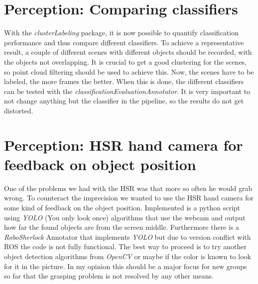 \documentclass[main.tex]{subfiles}
\begin{document}
		\section{Perception: Comparing classifiers}
		With the \textit{clusterLabeling} package, it is now possible to quantify classification performance and thus compare different classifiers. To achieve a 					representative result, a couple of different scenes with different objects should be recorded, with the objects not overlapping. It is crucial to get a
		good clustering for the scenes, so point cloud filtering should be used to achieve this. Now, the scenes have to be labeled, the more frames the better. 
		When this is done, the different classifiers can be tested with the \textit{classificationEvaluationAnnotator}. It is very important to not change anything but 
		the classifier in the pipeline, so the results do not get distorted.
		
		\section{Perception: HSR hand camera for feedback on object position}\label{fut_hsr_hand_camera_feedback}
		One of the problems we had with the HSR was that more so often he would grab wrong.
		To counteract the imprecision we wanted to use the HSR hand camera for some kind of feedback on the object position.
		Implemented is a python script using \textit{YOLO} (You only look once) algorithms that use the webcam and output how far the found objects are from the screen middle.
		Furthermore there is a \textit{RoboSherlock} Annotator that implements \textit{YOLO} but due to version conflict with ROS the code is not fully functional.
		The best way to proceed is to try another object detection algorithms from \textit{OpenCV} or maybe if the color is known to look for it in the picture.
		In my opinion this should be a major focus for new groups so far that the grasping problem is not resolved by any other means.

\end{document}
